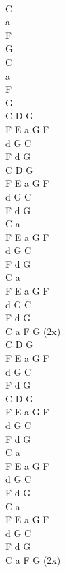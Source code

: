 \begin{chord}
[Recytacja]\\
C\\
a\\
F\\
G\\
C\\
a\\
F\\
G\\

C D G\\
F E a G F\\
d G C\\
F d G\\

C D G\\
F E a G F\\
d G C\\
F d G\\

C a\\
F E a G F\\
d G C\\
F d G  \\

C a\\
F E a G F\\
d G C\\
F d G  \\

C a F G (2x)\\
C D G\\
F E a G F\\
d G C\\
F d G\\

C D G\\
F E a G F\\
d G C\\
F d G\\

C a\\
F E a G F\\
d G C\\
F d G  \\

C a\\
F E a G F\\
d G C\\
F d G  \\
C a F G (2x)\\
\end{chord}
